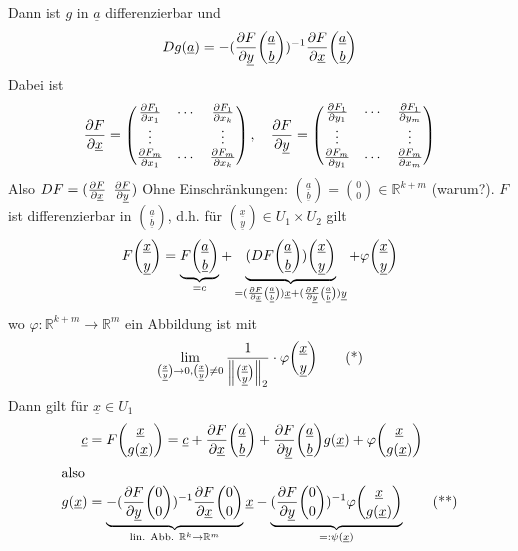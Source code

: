 Dann ist $g$ in $\underline{a}$ differenzierbar und  
\[
	D g(\underline{a}) = - (\frac{{\partial F}}{{\partial \underline{y}}}  \binom{\underline{a}}{\underline{b}}) ^{-1} \frac{{\partial F}}{{\partial \underline{x}}}  \binom{\underline{a}}{\underline{b}}
\]
Dabei ist 
\[
	\frac{{\partial F}}{{\partial \underline{x}}}  = \begin{pmatrix}
		\frac{{\partial F_1}}{{\partial x_1}}  & \cdots & \frac{{\partial F_1}}{{\partial x_k}}  \\
		\vdots & & \vdots \\
		\frac{{\partial F_m}}{{\partial x_1}}  & \cdots & \frac{{\partial F_m}}{{\partial x_k}} 
	\end{pmatrix} , \quad \frac{{\partial F}}{{\partial \underline{y}}}  = \begin{pmatrix}
		\frac{{\partial F_1}}{{\partial y_1}}  & \cdots & \frac{{\partial F_1}}{{\partial y_m}}  \\
		\vdots & & \vdots \\
		\frac{{\partial F_m}}{{\partial y_1}}  & \cdots & \frac{{\partial F_m}}{{\partial x_m}} 
	\end{pmatrix}
\] 
Also $D F = (\frac{{\partial F}}{{\partial \underline{x}}}  \enspace \frac{{\partial F}}{{\partial \underline{y}}} ) $
Ohne Einschränkungen: $\binom{\underline{a}}{\underline{b}} = \binom{0}{0}\in\mathds{R}^{k+m}$ (warum?). $F$ ist differenzierbar in $\binom{\underline{a}}{\underline{b}}$,
d.h. für $\binom{\underline{x}}{\underline{y}} \in U_1 \times U_2$ gilt
\begin{align*}
	F \binom{\underline{x}}{\underline{y}} = \underbrace{F \binom{\underline{a}}{\underline{b}}}_{=c} + \underbrace{(D F \binom{\underline{a}}{\underline{b}}) \binom{\underline{x}}{\underline{y}}}_{= (\frac{{\partial F}}{{\partial \underline{x}}}  \binom{\underline{a}}{\underline{b}}) \underline{x} + ( \frac{{\partial F}}{{\partial \underline{y}}}  \binom{\underline{a}}{\underline{b}} ) \underline{y}  } + \varphi \binom{\underline{x}}{\underline{y}} 
\end{align*}
wo $\varphi : \mathds{R}^{k+m} \to \mathds{R}^m$ ein Abbildung ist mit 
\[
	\lim_{ \binom{\underline{x}}{\underline{y}} \to 0, \binom{\underline{x}}{\underline{y}} \not= 0} \frac{1}{\norm[2]{\binom{\underline{x}}{\underline{y}}} } \cdot \varphi \binom{\underline{x}}{\underline{y}} \tag{*}
\]
Dann gilt für $\underline{x} \in U_1$
\begin{align*}
	\underline{c} &= F \binom{\underline{x}}{g(\underline{x})} = \underline{c} + \frac{{\partial F}}{{\partial \underline{x}}}  \binom{\underline{a}}{\underline{b}} + \frac{{\partial F}}{{\partial \underline{y}}} 
	\binom{\underline{a}}{\underline{b}} g(\underline{x}) + \varphi \binom{\underline{x}}{g(\underline{x})} \\
	\intertext{also}
	g(\underline{x}) &= \underbrace{- (\frac{{\partial F}}{{\partial \underline{y}}}  \binom{0}{0} )^{-1} \frac{{\partial F}}{{\partial \underline{x}}}  \binom{0}{0}}_{\text{lin. Abb. }\mathbb{R}^k \to \mathbb{R}^m} \underline{x} - \underbrace{(\frac{{\partial F}}{{\partial \underline{y}}}  
	\binom{0}{0} ) ^{-1} \varphi \binom{\underline{x}}{g(\underline{x})} }_{=: \psi (\underline{x})} \tag{**}
\end{align*}
